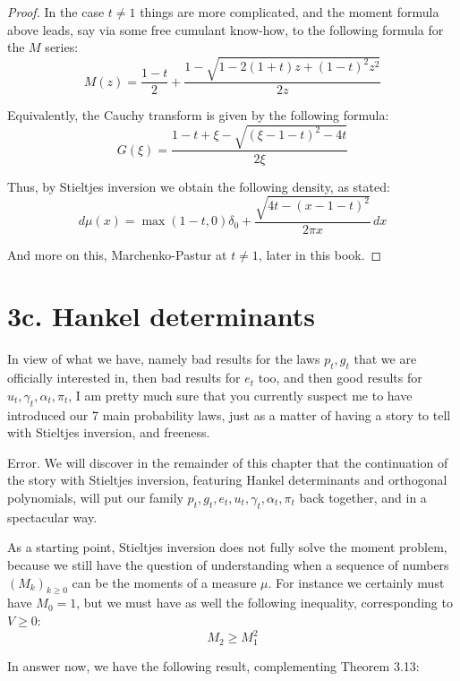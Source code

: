\documentclass[12pt]{amsbook}
\begin{document}
\begin{proof}
In the case $t\neq1$ things are more complicated, and the moment formula above leads, say via some free cumulant know-how, to the following formula for the $M$ series:
$$M(z)=\frac{1-t}{2}+\frac{1-\sqrt{1-2(1+t)z+(1-t)^2z^2}}{2z}$$

Equivalently, the Cauchy transform is given by the following formula:
$$G(\xi)=\frac{1-t+\xi-\sqrt{(\xi-1-t)^2-4t}}{2\xi}$$

Thus, by Stieltjes inversion we obtain the following density, as stated:
$$d\mu(x)
=\max(1-t,0)\delta_0+\frac{\sqrt{4t-(x-1-t)^2}}{2\pi x}\,dx$$

And more on this, Marchenko-Pastur at $t\neq1$, later in this book.
\end{proof}

\section*{3c. Hankel determinants}

In view of what we have, namely bad results for the laws $p_t,g_t$ that we are officially interested in, then bad results for $e_t$ too, and then good results for $u_t,\gamma_t,\alpha_t,\pi_t$, I am pretty much sure that you currently suspect me to have introduced our 7 main probability laws, just as a matter of having a story to tell with Stieltjes inversion, and freeness.

\bigskip

Error. We will discover in the remainder of this chapter that the continuation of the story with Stieltjes inversion, featuring Hankel determinants and orthogonal polynomials, will put our family $p_t,g_t,e_t,u_t,\gamma_t,\alpha_t,\pi_t$ back together, and in a spectacular way.

\bigskip

As a starting point, Stieltjes inversion does not fully solve the moment problem, because we still have the question of understanding when a sequence of numbers $(M_k)_{k\geq0}$ can be the moments of a measure $\mu$. For instance we certainly must have $M_0=1$, but we must have as well the following inequality, corresponding to $V\geq0$:
$$M_2\geq M_1^2$$

In answer now, we have the following result, complementing Theorem 3.13:

\end{document}
